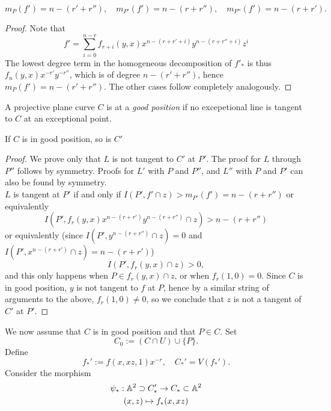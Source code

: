     \begin{lemma}
        $$
            m_{P}(f') = n - (r'+r''), \quad m_{P'}(f') = n-(r+r''),\quad m_{P''}(f')=n-(r+r').
        $$
    \end{lemma}
    \begin{proof}
        Note that 
        $$
            f' = \sum_{i=0}^{n-r} f_{r+i}(y,x)x^{n-(r+r'+i)}y^{n-(r+r''+i)}z^i
        $$
        The lowest degree term in the homogeneous decomposition of $f'_\ast$ is thus $f_n(y,x)x^{-r'}y^{-r''}$, which is of degree $n-(r'+r'')$, hence $m_{P}(f')=n-(r'+r'')$. The other cases follow completely analogously.  
    \end{proof}
    \begin{definition}
        A projective plane curve $C$ is at a \emph{good position} if no excepetional line is tangent to $C$ at an exceptional point. 
    \end{definition}
    \begin{lemma}
        If $C$ is in good position, so is $C'$
    \end{lemma}
    \begin{proof}
        We prove only that $L$ is not tangent to $C'$ at $P'$. The proof for $L$ through $P''$ follows by symmetry. Proofs for $L'$ with $P$ and $P''$, and $L''$ with $P$ and $P'$ can also be found by symmetry.\\
        $L$ is tangent at $P'$ if and only if $I(P',f'\cap z)>m_{P'}(f')=n-(r+r'')$ or equivalently 
        $$
            I\left(P',f_r(y,x)x^{n-(r+r')}y^{n-(r+r'')}\cap z\right) > n-(r+r'')
        $$ 
        or equivalently (since $I(P',y^{n-(r+r'')}\cap z)=0$ and $I(P',x^{n-(r+r')}\cap z)=n-(r+r')$)
        $$
            I\left(P',f_r(y,x)\cap z\right)>0,
        $$ 
        and this only happens when $P\in f_r(y,x)\cap z$, or when $f_r(1,0)=0$. Since $C$ is in good position, $y$ is not tangent to $f$ at $P$, hence by a similar string of arguments to the above, $f_r(1,0) \neq 0$, so we conclude that $z$ is not a tangent of $C'$ at $P'$.
    \end{proof}
    We now assume that $C$ is in good position and that $P\in C$. Set 
    $$
        C_0 := (C\cap U)\cup\{P\}.
    $$
    Define 
    $$
        f_\ast' := f(x,xz,1)x^{-r},\quad C_\ast' = V(f_\ast').
    $$
    Consider the morphism 
    \begin{gather*}
        \psi_\ast : \mathbb{A}^2\supset C_\ast'\rightarrow C_\ast\subset \mathbb{A}^2 \\
        (x,z)\mapsto f_\ast(x,xz)
    \end{gather*}
